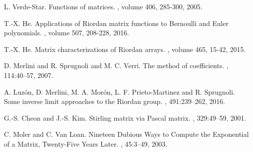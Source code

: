 \begin{thebibliography}{10}
L. Verde-Star.
\newblock Functions of matrices.
, volume 406, 285-300, 2005.

T.-X. He.
\newblock Applications of Riordan matrix functions to Bernoulli and Euler polynomials.
, volume 507, 208-228, 2016.

T.-X. He.
\newblock Matrix characterizations of Riordan arrays.
, volume 465, 15-42, 2015.

D. Merlini and R. Sprugnoli and M. C. Verri.
\newblock The method of coefficients.
, 114:40--57, 2007.

A. Luz\'on, D. Merlini, M. A. Mor\'on, L. F. Prieto-Martinez and R. Sprugnoli.
\newblock Some inverse limit approaches to the Riordan group.
, 491:239--262, 2016.

G.-S. Cheon and J.-S. Kim.
\newblock Stirling matrix via Pascal matrix.
, 329:49--59, 2001.

C. Moler and C. Van Loan.
\newblock Nineteen Dubious Ways to Compute the Exponential of a Matrix, Twenty-Five Years Later.
, 45:3--49, 2003.



\end{thebibliography}

